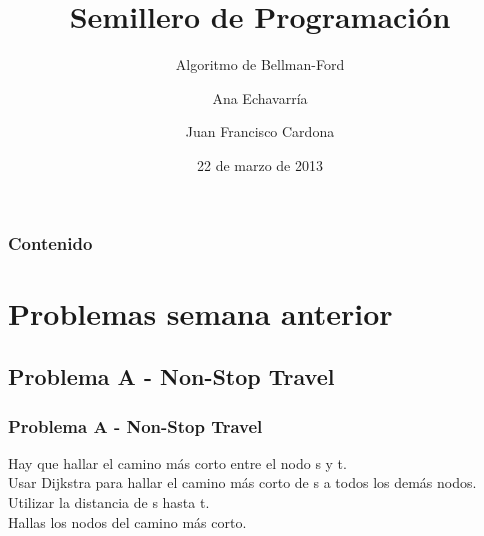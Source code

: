 \documentclass{beamer}
\title{Semillero de Programación}
\subtitle{Algoritmo de Bellman-Ford}
\author{Ana Echavarría \and Juan Francisco Cardona}
\institute{Universidad EAFIT}
\date{22 de marzo de 2013}
\begin{document}
\begin{frame}
	\titlepage
\end{frame}

\begin{frame}
	\frametitle{Contenido}
	\tableofcontents
\end{frame}

\section{Problemas semana anterior}
	\subsection{Problema A - Non-Stop Travel}
	\begin{frame}
		\frametitle{Problema A - Non-Stop Travel}
		Hay que hallar el camino más corto entre el nodo s y t.\\
		Usar Dijkstra para hallar el camino más corto de s a todos los demás nodos.\\
		Utilizar la distancia de s hasta t.\\
		Hallas los nodos del camino más corto.
	\end{frame}
	
\end{document}
